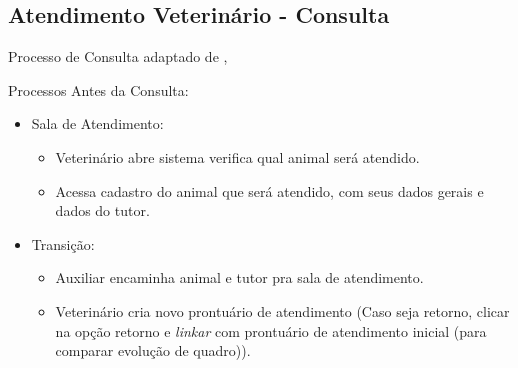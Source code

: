 \documentclass[
    12pt,               %
    openright,          %
    oneside,
    a4paper,            %
    BIBLATEX,           %
    TODO,               %
    english,            %
    brazil              %
    ]{ifsp-spo-inf-ctds}
\providecommand{\DIFadd}[1]{{\protect\color{blue}\uwave{#1}}} %
\providecommand{\DIFaddbegin}{} %
\providecommand{\DIFaddend}{} %
\newcommand{\DIFaddincludegraphics}[2][]{{\color{blue}\fbox{\DIFOincludegraphics[#1]{#2}}}} %
\DeclareRobustCommand{\DIFaddbegin}{\DIFOaddbegin \let\includegraphics\DIFaddincludegraphics} %
\DeclareRobustCommand{\DIFaddend}{\DIFOaddend \let\includegraphics\DIFOincludegraphics} %
\begin{document}
    \subsection{ Atendimento Veterinário - Consulta}
    Processo de Consulta adaptado de ,     

    
    Processos Antes da Consulta:

	\begin{itemize}
	    \item Sala de Atendimento:
            \begin{itemize}
                \item Veterinário abre sistema \DIFaddbegin \DIFadd{e }\DIFaddend verifica qual animal será atendido.
                \item Acessa cadastro do animal que será atendido, com seus dados gerais e dados do tutor.
            \end{itemize}
	\end{itemize}

		
    \begin{itemize}
        \item Transição:
            \begin{itemize}
                \item Auxiliar encaminha animal e tutor pra sala de atendimento.
                \item Veterinário cria novo prontuário de atendimento (Caso seja retorno, clicar na opção retorno e \emph{linkar} com prontuário de atendimento inicial (para comparar evolução de quadro)).
            \end{itemize}
    \end{itemize}
\end{document}
